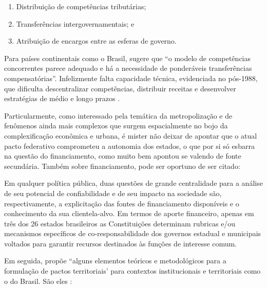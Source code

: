 \documentclass[
article,			%
11pt,				%
oneside,			%
a4paper,			%
english,			%
brazil,				%
sumario=tradicional
]{abntex2}
\begin{document}
	\begin{enumerate}
		\item Distribuição de competências tributárias;
		\item Transferências intergovernamentais; e
		\item Atribuição de encargos entre as esferas de governo.
	\end{enumerate}

	Para países continentais como o Brasil,  sugere que ``o modelo de competências concorrentes parece adequado e há a necessidade de ponderáveis transferências compensatórias''. Infelizmente falta capacidade técnica, evidenciada no pós-1988, que dificulta descentralizar competências, distribuir receitas e desenvolver estratégias de médio e longo prazos \cite[p. 120]{brandao2011a}.
	
	Particularmente, como interessado pela temática da metropolização e de fenômenos ainda mais complexos que surgem espacialmente no bojo da complexificação econômica e urbana, é mister não deixar de apontar que o atual pacto federativo comprometeu a autonomia dos estados, o que por si só esbarra na questão do financiamento, como muito bem apontou  se valendo de fonte secundária. Também sobre financiamento,  pode ser oportuno de ser citado:
	
	\begin{citacao}
		Em qualquer política pública, duas questões	de grande centralidade para a análise de seu potencial de confiabilidade e de seu impacto na sociedade são, respectivamente, a explicitação das fontes de financiamento disponíveis e o conhecimento da sua clientela-alvo. Em termos de aporte financeiro, apenas em três dos 26 estados brasileiros as Constituições determinam rubricas e/ou mecanismos específicos de co-responsabilidade dos governos estadual e municipais voltados para garantir recursos destinados às
		funções de interesse comum. \cite[p. 103]{guia2015a}
	\end{citacao}

	Em seguida,  propõe ``alguns elementos teóricos e metodológicos para a formulação de pactos territoriais' para contextos institucionais e territoriais como o do Brasil. São eles \cite[p. 122--131]{brandao2011a}:
	
\end{document}
